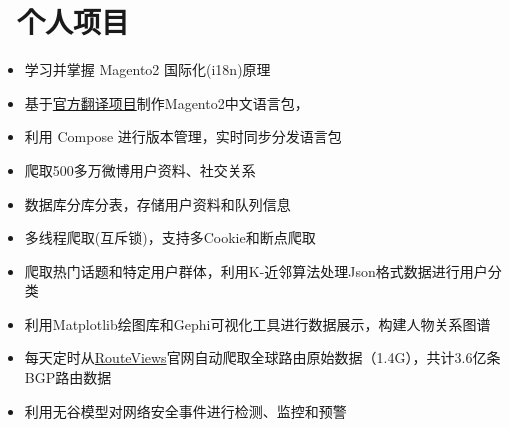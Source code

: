 \documentclass{resume}
\begin{document}
    \section{\faBriefcase\ 个人项目}
    \begin{onehalfspacing}
        \begin{itemize}
            \item 学习并掌握 Magento2 国际化(i18n)原理
            \item 基于\href{https://crowdin.com/project/magento-2/zh-CN}{官方翻译项目}制作Magento2中文语言包，
            \item 利用 Compose 进行版本管理，实时同步分发语言包
        \end{itemize}
    \end{onehalfspacing}
    \blankline{ }

    \begin{onehalfspacing}
        \begin{itemize}
            \item 爬取500多万微博用户资料、社交关系
            \item 数据库分库分表，存储用户资料和队列信息
            \item 多线程爬取(互斥锁)，支持多Cookie和断点爬取
            \item 爬取热门话题和特定用户群体，利用K-近邻算法处理Json格式数据进行用户分类
            \item 利用Matplotlib绘图库和Gephi可视化工具进行数据展示，构建人物关系图谱
        \end{itemize}
    \end{onehalfspacing}
    \blankline{ }

    \begin{onehalfspacing}
        \begin{itemize}
            \item 每天定时从\href{http://www.routeviews.org}{RouteViews}官网自动爬取全球路由原始数据（1.4G），共计3.6亿条BGP路由数据
            \item 利用无谷模型对网络安全事件进行检测、监控和预警
        \end{itemize}
    \end{onehalfspacing}
    \blankline{ }
\end{document}

